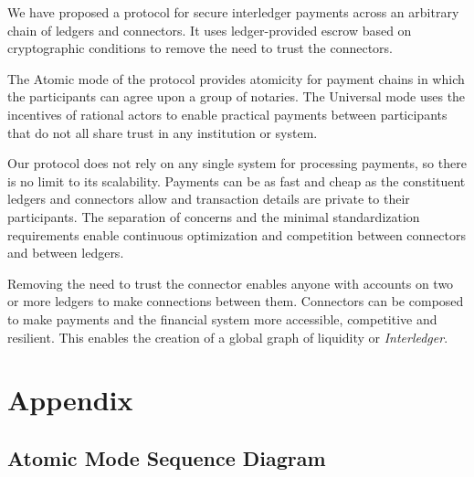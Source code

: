 \documentclass[letterpaper,twocolumn,10pt]{article}
\begin{document}
We have proposed a protocol for secure interledger payments across an arbitrary chain of ledgers and connectors. It uses ledger-provided escrow based on cryptographic conditions to remove the need to trust the connectors.

The Atomic mode of the protocol provides atomicity for payment chains in which the participants can agree upon a group of notaries. The Universal mode uses the incentives of rational actors to enable practical payments between participants that do not all share trust in any institution or system.

Our protocol does not rely on any single system for processing payments, so there is no limit to its scalability. Payments can be as fast and cheap as the constituent ledgers and connectors allow and transaction details are private to their participants. The separation of concerns and the minimal standardization requirements enable continuous optimization and competition between connectors and between ledgers.

Removing the need to trust the connector enables anyone with accounts on two or more ledgers to make connections between them. Connectors can be composed to make payments and the financial system more accessible, competitive and resilient. This enables the creation of a global graph of liquidity or \textit{Interledger}.





{\footnotesize 
}

\clearpage
\appendix
\section{Appendix}

\subsection{Atomic Mode Sequence Diagram}
\label{sec:atomic-sequence}
\end{document}
